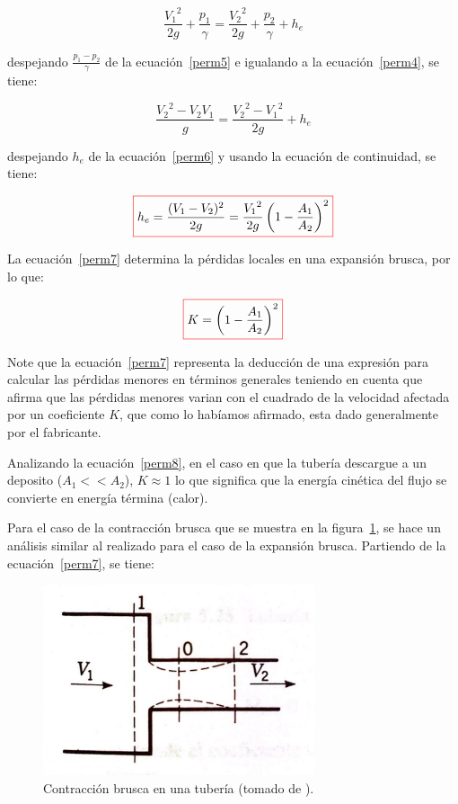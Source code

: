 \documentclass[11pt, oneside]{article}
\begin{document}
\begin{equation}
\frac{{V_1}^2}{2g} + \frac{p_1}{\gamma} = \frac{{V_2}^2}{2g} + \frac{p_2}{\gamma} + h_e
\label{perm5}
\end{equation}

despejando $\frac{p_1 - p_2}{\gamma}$ de la ecuaci\'on~\ref{perm5} e igualando a la ecuaci\'on~\ref{perm4}, se tiene:

\begin{equation}
\frac{{V_2}^2 - V_2 V_1}{g} = \frac{{V_2}^2 - {V_1}^2}{2g} + h_e
\label{perm6}
\end{equation}

despejando $h_e$ de la ecuaci\'on~\ref{perm6} y usando la ecuaci\'on de continuidad, se tiene:

\begin{equation}
\color{red}\boxed{\color{black} h_e = \frac{(V_1 - V_2)^2}{2g} = \frac{{V_1}^2}{2g}\left( 1- \frac{A_1}{A_2} \right)^2 }
\label{perm7}
\end{equation}

La ecuaci\'on~\ref{perm7} determina la p\'erdidas locales en una expansi\'on brusca, por lo que:

\begin{equation}
\color{red}\boxed{\color{black} K = \left( 1- \frac{A_1}{A_2} \right)^2 }
\label{perm8}
\end{equation}

Note que la ecuaci\'on~\ref{perm7} representa la deducci\'on de una expresi\'on para calcular las p\'erdidas menores en t\'erminos generales teniendo en cuenta que afirma que las p\'erdidas menores varian con el cuadrado de la velocidad afectada por un coeficiente $K$, que como lo hab\'iamos afirmado, esta dado generalmente por el fabricante. 

Analizando la ecuaci\'on~\ref{perm8}, en el caso en que la tuber\'ia descargue a un deposito ($A_1 << A_2$),  $K \approx 1$ lo que significa que la energ\'ia cin\'etica del flujo se convierte en energ\'ia t\'ermina (calor).  

Para el caso de la contracci\'on brusca que se muestra en la figura~\ref{contr}, se hace un an\'alisis similar al realizado para el caso de la expansi\'on brusca. Partiendo de la ecuaci\'on~\ref{perm7}, se tiene:

\begin{figure}[h]
\centering
\includegraphics[width=8cm]{contr.jpeg}
\caption{Contracci\'on brusca en una tuber\'ia (tomado de \cite{streeter}).}
\label{contr}
\end{figure}
\end{document}

